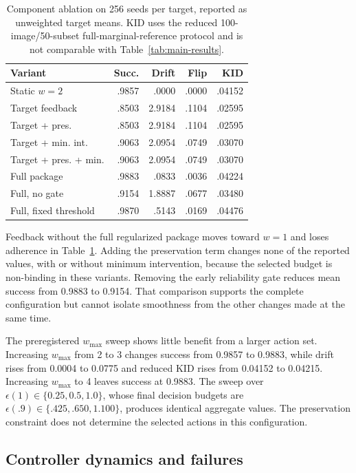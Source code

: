 \documentclass[10pt,twocolumn,letterpaper]{article}
\begin{document}
\begin{table}[t]
\caption{Component ablation on 256 seeds per target, reported as unweighted
target means. KID uses the reduced 100-image/50-subset full-marginal-reference
protocol and is not comparable with Table~\ref{tab:main-results}.}
\label{tab:components}
\centering
\scriptsize
\setlength{\tabcolsep}{2.6pt}
\begin{tabular}{@{}lrrrr@{}}
\toprule
Variant & Succ. & Drift & Flip & KID \\
\midrule
Static $w=2$ & .9857 & .0000 & .0000 & .04152 \\
Target feedback & .8503 & 2.9184 & .1104 & .02595 \\
Target + pres. & .8503 & 2.9184 & .1104 & .02595 \\
Target + min. int. & .9063 & 2.0954 & .0749 & .03070 \\
Target + pres. + min. & .9063 & 2.0954 & .0749 & .03070 \\
Full package & .9883 & .0833 & .0036 & .04224 \\
Full, no gate & .9154 & 1.8887 & .0677 & .03480 \\
Full, fixed threshold & .9870 & .5143 & .0169 & .04476 \\
\bottomrule
\end{tabular}
\end{table}

Feedback without the full regularized package moves toward $w=1$ and loses
adherence in Table~\ref{tab:components}. Adding the preservation term changes
none of the reported values, with or without minimum intervention, because the
selected budget is non-binding in these variants. Removing the early
reliability gate reduces mean success from 0.9883 to 0.9154. That comparison
supports the complete configuration but cannot isolate smoothness from the
other changes made at the same time.

The preregistered $w_{\max}$ sweep shows little benefit from a larger action
set. Increasing $w_{\max}$ from 2 to 3 changes success from 0.9857 to 0.9883,
while drift rises from 0.0004 to 0.0775 and reduced KID rises from 0.04152 to
0.04215. Increasing $w_{\max}$ to 4 leaves success at 0.9883. The sweep over
$\epsilon(1)\in\{0.25,0.5,1.0\}$, whose final decision budgets are
$\epsilon(.9)\in\{.425,.650,1.100\}$, produces identical aggregate values.
The preservation constraint does not determine the selected actions in this
configuration.

\subsection{Controller dynamics and failures}
\end{document}
